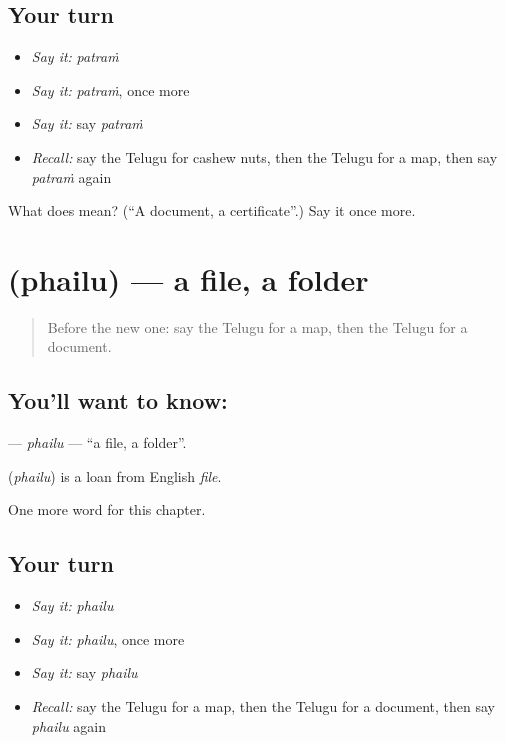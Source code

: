 \subsection*{Your turn}
\begin{itemize}
\raggedright
  \item \emph{Say it:} \emph{patraṁ}
  \item \emph{Say it:} \emph{patraṁ}, once more
  \item \emph{Say it:} say \emph{patraṁ}
  \item \emph{Recall:} say the Telugu for cashew nuts, then the Telugu for a map, then say \emph{patraṁ} again
\end{itemize}

\begin{tcolorbox}[breakable,colback=teal!4,colframe=teal!35!black,title={Before you move on}]
What does  mean? (\textquotedblleft{}A document, a certificate\textquotedblright{}.) Say it once more.
\end{tcolorbox}
\section[\texorpdfstring{\te{ఫైలు} (phailu)}{ఫైలు (phailu)}]{ (phailu) — a file, a folder}

\label{lesson:TE-C226-phailu}



\begin{quote}
Before the new one: say the Telugu for a map, then the Telugu for a document.
\end{quote}

\subsection*{You'll want to know: }
\textbf{} — \emph{phailu} — \textquotedblleft{}a file, a folder\textquotedblright{}.

\begin{cousinweb}
\textbf{} (\emph{phailu}) is a loan from English \emph{file}.
\end{cousinweb}

\begin{grammarlens}[title={What you've built}]
One more word for this chapter.
\end{grammarlens}

\subsection*{Your turn}
\begin{itemize}
\raggedright
  \item \emph{Say it:} \emph{phailu}
  \item \emph{Say it:} \emph{phailu}, once more
  \item \emph{Say it:} say \emph{phailu}
  \item \emph{Recall:} say the Telugu for a map, then the Telugu for a document, then say \emph{phailu} again
\end{itemize}

